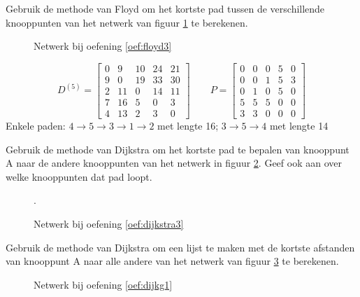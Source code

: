 \begin{oef}
\label{oef:floyd3}
\papier Gebruik de methode van Floyd om het kortste pad tussen de verschillende knooppunten van het netwerk van figuur \ref{fig:oefFloyd3} te berekenen.
\begin{figure}[htbp]
\centering

\caption{Netwerk bij oefening \ref{oef:floyd3}}
\label{fig:oefFloyd3}
\end{figure}

\begin{opl}
\begin{equation*}
D^{(5)}=\begin{bmatrix}
0 & 9 & 10 & 24 & 21\\
9 & 0 & 19 & 33 & 30\\
2 & 11 & 0 & 14 & 11\\
7 & 16 & 5 & 0 & 3\\
4 & 13 & 2 & 3 &0
\end{bmatrix}
\qquad
P=\begin{bmatrix}
0 & 0 & 0 & 5 & 0\\
0 & 0 & 1 & 5 & 3\\
0 & 1 & 0 & 5 & 0\\
5 & 5 & 5 & 0 & 0\\
3 & 3 & 0 & 0 & 0
\end{bmatrix}
\end{equation*}
Enkele paden: $4 \rightarrow5\rightarrow3\rightarrow1\rightarrow2$ met lengte 16; $3\rightarrow5\rightarrow4$ met lengte 14
\end{opl}
\end{oef}


\newpage
\begin{oef}
\label{oef:dijkstra3}
\papier Gebruik de methode van Dijkstra om het kortste pad te bepalen van knooppunt A naar de andere knooppunten van het netwerk in figuur \ref{fig:oefDijkstra3}. Geef ook aan over welke knooppunten dat pad loopt.
\begin{figure}[htbp]
\centering

\caption{Netwerk bij oefening \ref{oef:dijkstra3}}.
\label{fig:oefDijkstra3}
\end{figure}
\end{oef}

\newpage
\begin{oef}
\label{oef:dijkg1}
\papier Gebruik de methode van Dijkstra om een lijst te maken met de kortste afstanden van knooppunt A naar alle andere van het netwerk van figuur \ref{fig:oefDijkg1} te berekenen.
\begin{figure}[htbp]
\centering

\caption{Netwerk bij oefening \ref{oef:dijkg1}}
\label{fig:oefDijkg1}
\end{figure}
\end{oef}


